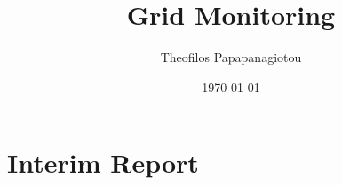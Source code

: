 \documentclass[a4paper,12pt,oneside]{book}
\begin{document}
\title{Grid Monitoring}
\author{Theofilos Papapanagiotou}
\date{\today}
\maketitle
\frontmatter

\tableofcontents
\clearpage
\mainmatter
\pagestyle{fancy}
\renewcommand{\headrulewidth}{1pt}
\renewcommand{\footrulewidth}{1pt}
\addtolength{\headheight}{0pt}
\fancyfoot[LE]{\thepage}
\addtolength{\textheight}{70pt}

\chapter[Interim Report]{Interim Report}





\backmatter



\end{document}
